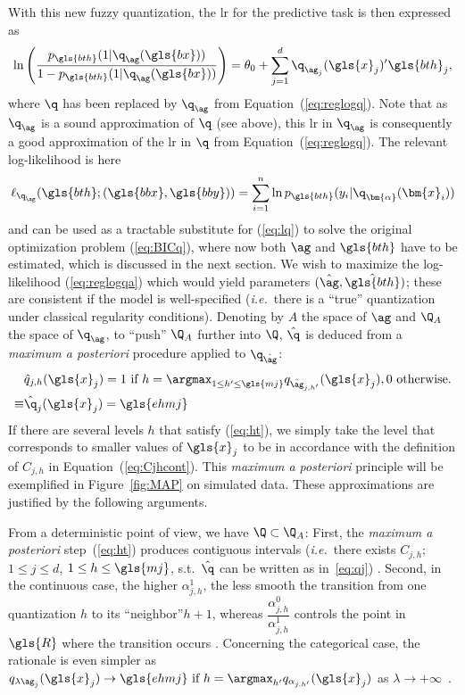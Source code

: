 With this new fuzzy quantization, the \gls{lr} for the predictive task is then expressed as
\begin{equation}
    \label{eq:reglogqa}
    \ln \left( \dfrac{p_{\gls{bth}}(1|\q_{\ag} (\gls{bx}))}{1 - p_{\gls{bth}}(1|\q_{\ag} (\gls{bx}))} \right) = \theta_0 + \sum_{j=1}^d { \q_{\ag_{j}}(\gls{x}_j)' \gls{bth}_j },
\end{equation}
where $\q$ has been replaced by $\q_{\ag}$ from Equation~(\ref{eq:reglogq}).
Note that as $\q_{\ag}$ is a sound approximation of $\q$ (see above), this \gls{lr} in $\q_{\ag}$ is consequently a good approximation of the \gls{lr} in $\q$ from Equation~(\ref{eq:reglogq}). The relevant log-likelihood is here 
\begin{equation}
    \label{eq:lqa}
    \ell_{\q_{\ag}}(\gls{bth} ; (\gls{bbx},\gls{bby}))=\sum_{i=1}^n \ln p_{\gls{bth}}(y_i|\q_{\bm{\alpha}}(\bm{x}_i))
\end{equation}
and can be used as a tractable substitute for (\ref{eq:lq}) to solve the original optimization problem (\ref{eq:BICq}), where now both $\ag$ and $\gls{bth}$ have to be estimated, which is discussed in the next section. We wish to maximize the log-likelihood (\ref{eq:reglogqa}) which would yield parameters $(\hat{\ag},\hat{\gls{bth}})$; these are consistent if the model is well-specified (\textit{i.e.}\ there is a ``true'' quantization under classical regularity conditions). Denoting by $A$ the space of $\ag$ and $\Q_A$ the space of $\q_{\ag}$, to ``push'' $\Q_A$ further into $\Q$, $\hat{\q}$ is deduced from a \textit{maximum a posteriori} procedure applied to $\q_{\hat{\ag}}$:
\begin{align}
    \label{eq:ht}
    & \hat{q}_{j,h}(\gls{x}_j) = 1 \text{ if } h = \argmax_{1 \leq h' \leq \gls{mj}} q_{\hat{\ag}_{j,h'}}(\gls{x}_j), 0 \text{ otherwise.} \\
    \equiv & \hat{\q}_j(\gls{x}_j) = \gls{ehmj} \nonumber
\end{align}
If there are several levels $h$ that satisfy (\ref{eq:ht}), we simply take the level that corresponds to smaller values of $\gls{x}_j$ to be in accordance with the definition of $C_{j,h}$ in Equation~(\ref{eq:Cjhcont}). This {\it maximum a posteriori} principle will be exemplified in Figure~\ref{fig:MAP} on simulated data. These approximations are justified by the following arguments. 

From a deterministic point of view, we have $\Q \subset \Q_A$: First, the \textit{maximum a posteriori} step~(\ref{eq:ht}) produces contiguous intervals (\textit{i.e.}\ there exists $C_{j,h}$; $1 \leq j \leq d$, $1 \leq h \leq \gls{mj}$, s.t.\ ${\hat{\q}}$ can be written as in~\ref{eq:qj}) \cite{same2011model}. Second, in the continuous case, the higher $\alpha_{j,h}^1$, the less smooth the transition from one quantization $h$ to its ``neighbor''\footnotemark[1] $h+1$, whereas $\dfrac{\alpha_{j,h}^0}{\alpha_{j,h}^1}$ controls the point in $\gls{R}$ where the transition occurs \cite{chamroukhi2009regression}. Concerning the categorical case, the rationale is even simpler as $q_{\lambda \ag_j}(\gls{x}_j) \to \gls{ehmj} \text{ if } h = \argmax_{h'} q_{\alpha_{j,h'}}(\gls{x}_j)$ as $\lambda \to +\infty$~\cite{reverdy2016parameter}.

